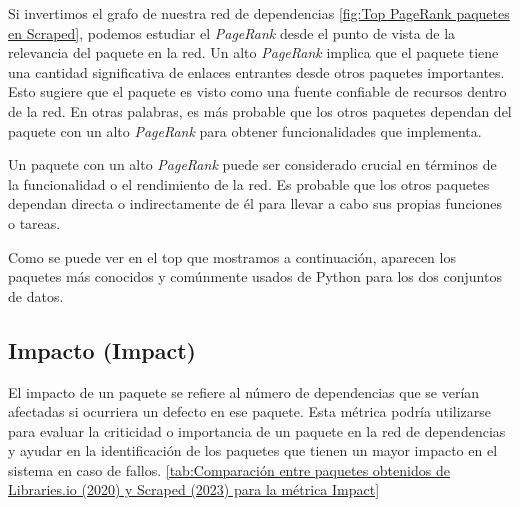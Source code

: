 Si invertimos el grafo de nuestra red de dependencias \ref{fig:Top PageRank paquetes en Scraped}, podemos estudiar el \textit{PageRank}
desde el punto de vista de la relevancia del paquete en la red. Un alto \textit{PageRank}
implica que el paquete tiene una cantidad significativa de enlaces entrantes desde otros paquetes
importantes. Esto sugiere que el paquete es visto como una fuente confiable de recursos dentro de la red.
En otras palabras, es más probable que los otros paquetes dependan del paquete con un alto \textit{PageRank} para obtener
funcionalidades que implementa.

Un paquete con un alto \textit{PageRank} puede ser considerado crucial en términos de la funcionalidad
o el rendimiento de la red. Es probable que los otros paquetes dependan directa o indirectamente de
él para llevar a cabo sus propias funciones o tareas.

Como se puede ver en el top que mostramos a continuación, aparecen los paquetes más conocidos y
comúnmente usados de Python para los dos conjuntos de datos.

\subsection{Impacto (Impact)}

El impacto de un paquete se refiere al número de dependencias que se verían afectadas si
ocurriera un defecto en ese paquete. Esta métrica podría utilizarse para evaluar la criticidad
o importancia de un paquete en la red de dependencias y ayudar en la identificación de los
paquetes que tienen un mayor impacto en el sistema en caso de fallos. \ref{tab:Comparación entre paquetes obtenidos de Libraries.io (2020) y Scraped (2023) para la métrica Impact}

